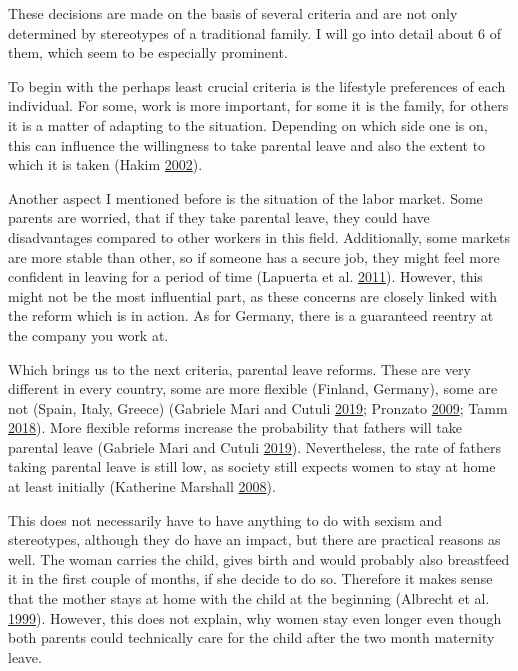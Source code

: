 \documentclass[
  12pt,
]{article}
\begin{document}
These decisions are made on the basis of several criteria and are not only determined by stereotypes of a traditional family. I will go into detail about 6 of them, which seem to be especially prominent.

To begin with the perhaps least crucial criteria is the lifestyle preferences of each individual. For some, work is more important, for some it is the family, for others it is a matter of adapting to the situation. Depending on which side one is on, this can influence the willingness to take parental leave and also the extent to which it is taken (Hakim \protect\hyperlink{ref-hakim_lifestyle_2002}{2002}).

Another aspect I mentioned before is the situation of the labor market. Some parents are worried, that if they take parental leave, they could have disadvantages compared to other workers in this field. Additionally, some markets are more stable than other, so if someone has a secure job, they might feel more confident in leaving for a period of time (Lapuerta et al. \protect\hyperlink{ref-lapuerta_individual_2011}{2011}).
However, this might not be the most influential part, as these concerns are closely linked with the reform which is in action. As for Germany, there is a guaranteed reentry at the company you work at.

Which brings us to the next criteria, parental leave reforms. These are very different in every country, some are more flexible (Finland, Germany), some are not (Spain, Italy, Greece) (Gabriele Mari and Cutuli \protect\hyperlink{ref-gabriele_mari_parental_2019}{2019}; Pronzato \protect\hyperlink{ref-pronzato_return_2009}{2009}; Tamm \protect\hyperlink{ref-tamm_fathers_2018}{2018}). More flexible reforms increase the probability that fathers will take parental leave (Gabriele Mari and Cutuli \protect\hyperlink{ref-gabriele_mari_parental_2019}{2019}).
Nevertheless, the rate of fathers taking parental leave is still low, as society still expects women to stay at home at least initially (Katherine Marshall \protect\hyperlink{ref-katherine_marshall_fathers_2008}{2008}).

This does not necessarily have to have anything to do with sexism and stereotypes, although they do have an impact, but there are practical reasons as well. The woman carries the child, gives birth and would probably also breastfeed it in the first couple of months, if she decide to do so. Therefore it makes sense that the mother stays at home with the child at the beginning (Albrecht et al. \protect\hyperlink{ref-albrecht_career_1999}{1999}). However, this does not explain, why women stay even longer even though both parents could technically care for the child after the two month maternity leave.
\end{document}
